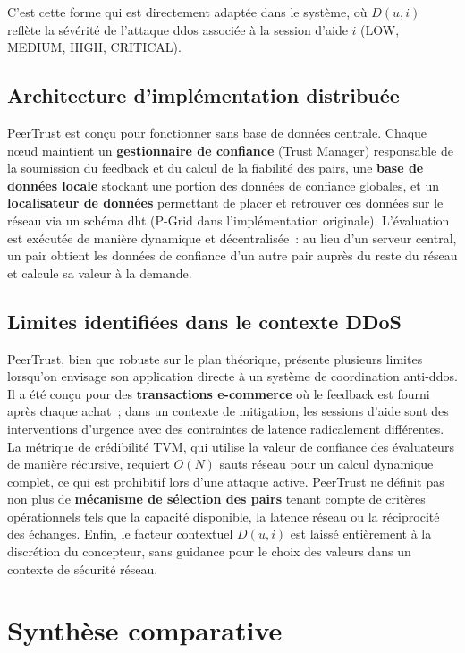 C'est cette forme qui est directement adaptée dans le système, où $D(u,i)$ reflète la sévérité de l'attaque \gls{ddos} associée à la session d'aide $i$ (LOW, MEDIUM, HIGH, CRITICAL).

\subsection{Architecture d'implémentation distribuée}

PeerTrust est conçu pour fonctionner sans base de données centrale. Chaque n\oe{}ud maintient un \textbf{gestionnaire de confiance} (Trust Manager) responsable de la soumission du feedback et du calcul de la fiabilité des pairs, une \textbf{base de données locale} stockant une portion des données de confiance globales, et un \textbf{localisateur de données} permettant de placer et retrouver ces données sur le réseau via un schéma \gls{dht} (P-Grid dans l'implémentation originale). L'évaluation est exécutée de manière dynamique et décentralisée~: au lieu d'un serveur central, un pair obtient les données de confiance d'un autre pair auprès du reste du réseau et calcule sa valeur à la demande.

\subsection{Limites identifiées dans le contexte DDoS}

PeerTrust, bien que robuste sur le plan théorique, présente plusieurs limites lorsqu'on envisage son application directe à un système de coordination anti-\gls{ddos}. Il a été conçu pour des \textbf{transactions e-commerce} où le feedback est fourni après chaque achat~; dans un contexte de mitigation, les sessions d'aide sont des interventions d'urgence avec des contraintes de latence radicalement différentes. La métrique de crédibilité TVM, qui utilise la valeur de confiance des évaluateurs de manière récursive, requiert $O(N)$ sauts réseau pour un calcul dynamique complet, ce qui est prohibitif lors d'une attaque active. PeerTrust ne définit pas non plus de \textbf{mécanisme de sélection des pairs} tenant compte de critères opérationnels tels que la capacité disponible, la latence réseau ou la réciprocité des échanges. Enfin, le facteur contextuel $D(u,i)$ est laissé entièrement à la discrétion du concepteur, sans guidance pour le choix des valeurs dans un contexte de sécurité réseau.

\section{Synthèse comparative}
\label{sec:synthese}

